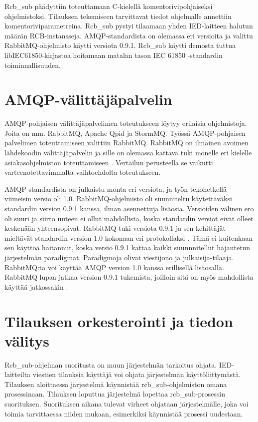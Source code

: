 Rcb\_sub päädyttiin toteuttamaan C-kielellä komentorivipohjaiseksi ohjelmistoksi. Tilauksen tekemiseen tarvittavat tiedot ohjelmalle annettiin komentoriviparametreina. Rcb\_sub pystyi tilaamaan yhden IED-laitteen halutun määrän RCB-instansseja. AMQP-standardista on olemassa eri versioita ja valittu RabbitMQ-ohjelmisto käytti versiota 0.9.1. Rcb\_sub käytti demosta tuttua libIEC61850-kirjastoa hoitamaan matalan tason IEC 61850 -standardin toiminnallisuuden.


\section{AMQP-välittäjäpalvelin}
AMQP-pohjaisen välittäjäpalvelimen toteutukseen löytyy erilaisia ohjelmistoja. Joita on mm. RabbitMQ, Apache Qpid ja StormMQ. Työssä AMQP-pohjaisen palvelimen toteuttamiseen valittiin RabbitMQ. RabbitMQ on ilmainen avoimen lähdekoodin välittäjäpalvelin ja sille on olemassa kattava tuki monelle eri kielelle asiakasohjelmiston toteuttamiseen \cite{rabbitmq-supported-languages}. Vertailun perusteella se vaikutti varteenotettavimmalta vaihtoehdolta toteutukseen.

AMQP-standardista on julkaistu monta eri versiota, ja työn tekohetkellä viimeisin versio oli 1.0. RabbitMQ-ohjelmisto oli suunniteltu käytettäväksi standardin version 0.9.1 kanssa, ilman asennettuja lisäosia. Versioiden välinen ero oli suuri ja siirto uuteen ei ollut mahdollista, koska standardin versiot eivät olleet keskenään yhteensopivat. RabbitMQ tuki versiota 0.9.1 ja sen kehittäjät mieltävät standardin version 1.0 kokonaan eri protokollaksi \cite{RabbitMQ-Compatibility-and-Conformance}. Tämä ei kuitenkaan sen käyttöä haitannut, koska versio 0.9.1 kattaa kaikki suunnnitellut hajautetun järjestelmän paradigmat. Paradigmoja olivat viestijono ja julkaisija-tilaaja. RabbitMQ:ta voi käyttää AMQP version 1.0 kanssa erillisellä lisäosalla. RabbitMQ lupaa jatkaa version 0.9.1 tukemista, joilloin sitä on myös mahdollista käyttää jatkossakin \cite{RabbitMQ-Compatibility-and-Conformance}.


\section{Tilauksen orkesterointi ja tiedon välitys}
Rcb\_sub-ohjelman suoritusta on muun järjestelmän tarkoitus ohjata. IED-laitteilta viestien tilauksia käyttäjä voi ohjata järjestelmän käyttöliittymästä. Tilauksen aloittaessa järjestelmä käynnistää rcb\_sub-ohjelmiston omana prosessinaan. Tilauksen loputtua järjestelmä lopettaa rcb\_sub-prosessin suorituksen. Suorituksen aikana tulevat virheet ohjataan järjestelmälle, joka voi toimia tarvittaessa niiden mukaan, esimerkiksi käynnistää prosessi uudestaan.

